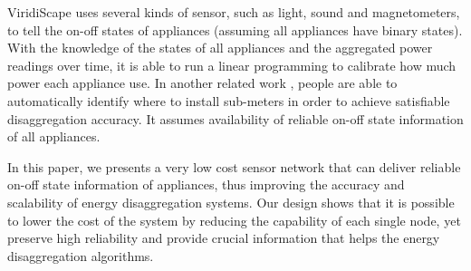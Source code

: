 ViridiScape \cite{Kim2009a} uses several kinds of sensor, such as light, sound and magnetometers, to tell the on-off states of appliances (assuming all appliances have binary states). With the knowledge of the states of all appliances and the aggregated power readings over time, it is able to run a linear programming to calibrate how much power each appliance use. In another related work \cite{Jung2010}, people are able to automatically identify where to install sub-meters in order to achieve satisfiable disaggregation accuracy. It assumes availability of reliable on-off state information of all appliances. 

In this paper, we presents a very low cost sensor network that can deliver reliable on-off state information of appliances, thus improving the accuracy and scalability of energy disaggregation systems. Our design shows that it is possible to lower the cost of the system by reducing the capability of each single node, yet preserve high reliability and provide crucial information that helps the energy disaggregation algorithms. 

